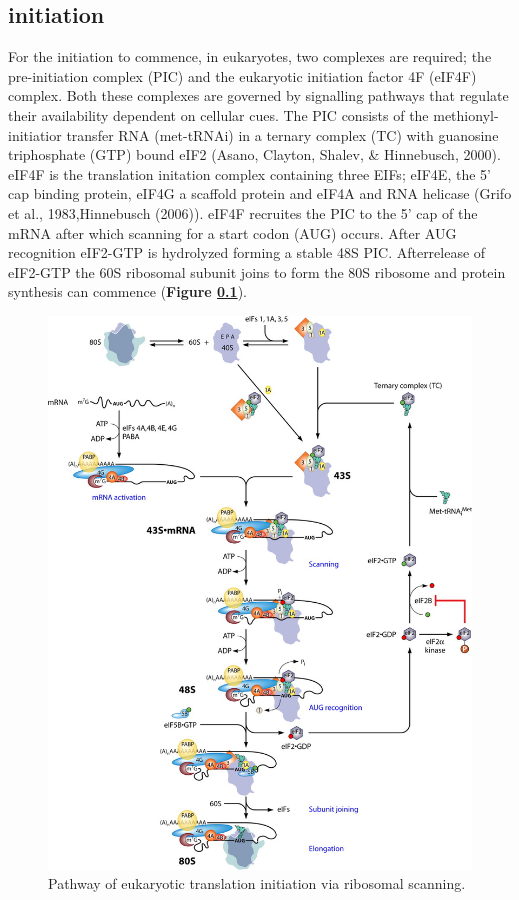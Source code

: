 \documentclass[12pt,openany]{book}
\begin{document}
\clearpage

\subsection{initiation} \label{initiation}

For the initiation to commence, in eukaryotes, two complexes are
required; the pre-initiation complex (PIC) and the eukaryotic initiation
factor 4F (eIF4F) complex. Both these complexes are governed by
signalling pathways that regulate their availability dependent on
cellular cues. The PIC consists of the methionyl-initiatior transfer RNA
(met-tRNAi) in a ternary complex (TC) with guanosine triphosphate (GTP)
bound eIF2 (Asano, Clayton, Shalev, \& Hinnebusch, 2000). eIF4F is the
translation initation complex containing three EIFs; eIF4E, the 5' cap
binding protein, eIF4G a scaffold protein and eIF4A and RNA helicase
(Grifo et al., 1983,Hinnebusch (2006)). eIF4F recruites the PIC to the
5' cap of the mRNA after which scanning for a start codon (AUG) occurs.
After AUG recognition eIF2-GTP is hydrolyzed forming a stable 48S PIC.
Afterrelease of eIF2-GTP the 60S ribosomal subunit joins to form the 80S
ribosome and protein synthesis can commence (\textbf{Figure
\ref{initiation}}).

\begin{figure}
  \includegraphics{./figures/initiation.jpg}
  \caption{Pathway of eukaryotic translation initiation via ribosomal scanning.
 \label{fig:initiation}}
\end{figure}
\end{document}

